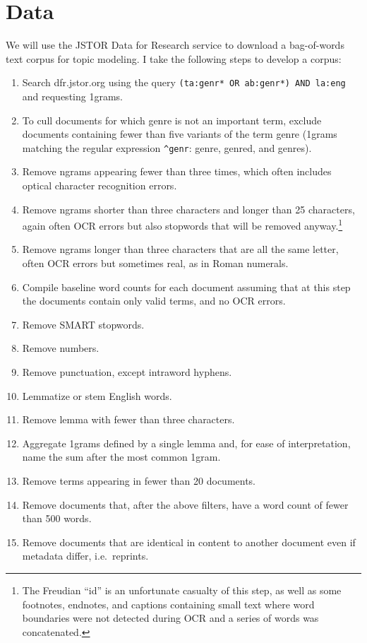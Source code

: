 \documentclass[]{book}
\providecommand{\tightlist}{%
  \setlength{\itemsep}{0pt}\setlength{\parskip}{0pt}}
\let\rmarkdownfootnote\footnote%
\def\footnote{\protect\rmarkdownfootnote}
\theoremstyle{definition}
\theoremstyle{definition}
\theoremstyle{definition}
\theoremstyle{remark}
\begin{document}
\hypertarget{data}{%
\section{Data}\label{data}}

We will use the JSTOR Data for Research service to download a
bag-of-words text corpus for topic modeling. I take the following steps
to develop a corpus:

\begin{enumerate}
\def\labelenumi{\arabic{enumi}.}
\tightlist
\item
  Search dfr.jstor.org using the query
  \texttt{(ta:genr*\ OR\ ab:genr*)\ AND\ la:eng} and requesting 1grams.
\item
  To cull documents for which genre is not an important term, exclude
  documents containing fewer than five variants of the term genre
  (1grams matching the regular expression \texttt{\^{}genr}: genre,
  genred, and genres).
\item
  Remove ngrams appearing fewer than three times, which often includes
  optical character recognition errors.
\item
  Remove ngrams shorter than three characters and longer than 25
  characters, again often OCR errors but also stopwords that will be
  removed anyway.\footnote{The Freudian ``id'' is an unfortunate
    casualty of this step, as well as some footnotes, endnotes, and
    captions containing small text where word boundaries were not
    detected during OCR and a series of words was concatenated.}
\item
  Remove ngrams longer than three characters that are all the same
  letter, often OCR errors but sometimes real, as in Roman numerals.
\item
  Compile baseline word counts for each document assuming that at this
  step the documents contain only valid terms, and no OCR errors.
\item
  Remove SMART stopwords.
\item
  Remove numbers.
\item
  Remove punctuation, except intraword hyphens.
\item
  Lemmatize or stem English words.
\item
  Remove lemma with fewer than three characters.
\item
  Aggregate 1grams defined by a single lemma and, for ease of
  interpretation, name the sum after the most common 1gram.
\item
  Remove terms appearing in fewer than 20 documents.
\item
  Remove documents that, after the above filters, have a word count of
  fewer than 500 words.
\item
  Remove documents that are identical in content to another document
  even if metadata differ, i.e.~reprints.
\end{enumerate}
\end{document}
